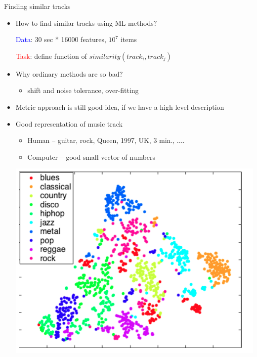 \documentclass{beamer}
\begin{document}
\begin{frame}{Finding similar tracks}
	\begin{itemize}
		\item     How to find similar tracks using ML methods?
		\begin{center}		  
			   \textcolor{blue}{Data}: 30 sec * 16000 features, $10^7$ items
			
			   \textcolor{red}{Task}: define function of $similarity(track_i, track_j)$
		\end{center}
		
		\item         Why ordinary methods are so bad?
		\begin{itemize}
			\item      shift and noise tolerance, over-fitting 
		\end{itemize}
		
		\item      Metric approach is still good idea, if we have a high level description
		\item      Good representation of music track
		\begin{itemize}
			\item      Human -- guitar, rock, Queen, 1997, UK, 3 min., .... 
			\item      Computer -- good small vector of numbers  
		\end{itemize}
		
		\begin{center}
			   \includegraphics[scale=0.2]{img/geners}
		\end{center}
		
	\end{itemize}
\end{frame}
\end{document}
